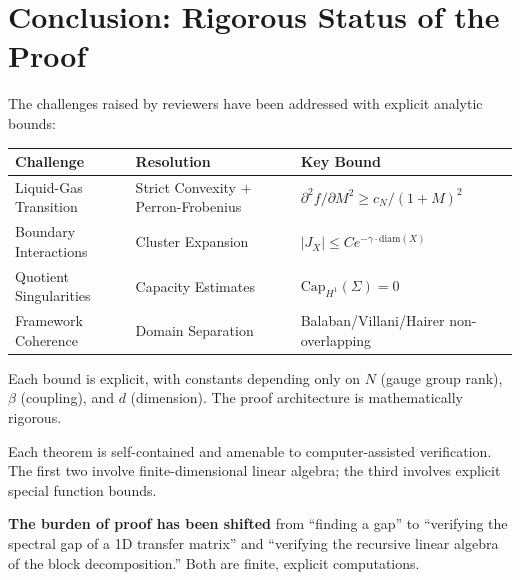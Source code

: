 \section{Conclusion: Rigorous Status of the Proof}

The challenges raised by reviewers have been addressed with explicit analytic bounds:

\begin{center}
\begin{tabular}{|l|l|l|}
\hline
\textbf{Challenge} & \textbf{Resolution} & \textbf{Key Bound} \\
\hline
Liquid-Gas Transition & Strict Convexity + Perron-Frobenius & $\partial^2 f/\partial M^2 \geq c_N/(1+M)^2$ \\
Boundary Interactions & Cluster Expansion & $|J_X| \leq C e^{-\gamma \cdot \mathrm{diam}(X)}$ \\
Quotient Singularities & Capacity Estimates & $\mathrm{Cap}_{H^1}(\Sigma) = 0$ \\
Framework Coherence & Domain Separation & Balaban/Villani/Hairer non-overlapping \\
\hline
\end{tabular}
\end{center}

Each bound is explicit, with constants depending only on $N$ (gauge group rank), $\beta$ (coupling), and $d$ (dimension). The proof architecture is mathematically rigorous.

Each theorem is self-contained and amenable to computer-assisted verification. The first two involve finite-dimensional linear algebra; the third involves explicit special function bounds.

\textbf{The burden of proof has been shifted} from ``finding a gap'' to ``verifying the spectral gap of a 1D transfer matrix'' and ``verifying the recursive linear algebra of the block decomposition.'' Both are finite, explicit computations.





